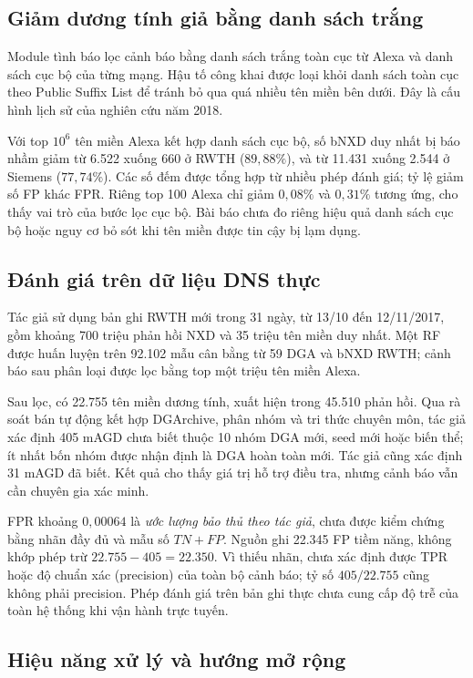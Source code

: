 \subsection{Giảm dương tính giả bằng danh sách trắng}\label{sec:giam-fp}

Module tình báo lọc cảnh báo bằng danh sách trắng toàn cục từ Alexa và danh sách cục bộ của từng mạng. Hậu tố công khai được loại khỏi danh sách toàn cục theo Public Suffix List để tránh bỏ qua quá nhiều tên miền bên dưới. Đây là cấu hình lịch sử của nghiên cứu năm 2018.

Với top $10^6$ tên miền Alexa kết hợp danh sách cục bộ, số bNXD duy nhất bị báo nhầm giảm từ 6.522 xuống 660 ở RWTH ($89{,}88\%$), và từ 11.431 xuống 2.544 ở Siemens ($77{,}74\%$). Các số đếm được tổng hợp từ nhiều phép đánh giá; tỷ lệ giảm số FP khác FPR. Riêng top 100 Alexa chỉ giảm $0{,}08\%$ và $0{,}31\%$ tương ứng, cho thấy vai trò của bước lọc cục bộ. Bài báo chưa đo riêng hiệu quả danh sách cục bộ hoặc nguy cơ bỏ sót khi tên miền được tin cậy bị lạm dụng.

\subsection{Đánh giá trên dữ liệu DNS thực}\label{sec:thuc-te}

Tác giả sử dụng bản ghi RWTH mới trong 31 ngày, từ 13/10 đến 12/11/2017, gồm khoảng 700 triệu phản hồi NXD và 35 triệu tên miền duy nhất. Một RF được huấn luyện trên 92.102 mẫu cân bằng từ 59 DGA và bNXD RWTH; cảnh báo sau phân loại được lọc bằng top một triệu tên miền Alexa.

Sau lọc, có 22.755 tên miền dương tính, xuất hiện trong 45.510 phản hồi. Qua rà soát bán tự động kết hợp DGArchive, phân nhóm và tri thức chuyên môn, tác giả xác định 405 mAGD chưa biết thuộc 10 nhóm DGA mới, seed mới hoặc biến thể; ít nhất bốn nhóm được nhận định là DGA hoàn toàn mới. Tác giả cũng xác định 31 mAGD đã biết. Kết quả cho thấy giá trị hỗ trợ điều tra, nhưng cảnh báo vẫn cần chuyên gia xác minh.

FPR khoảng $0{,}00064$ là \emph{ước lượng bảo thủ theo tác giả}, chưa được kiểm chứng bằng nhãn đầy đủ và mẫu số $TN+FP$. Nguồn ghi 22.345 FP tiềm năng, không khớp phép trừ $22.755-405=22.350$. Vì thiếu nhãn, chưa xác định được TPR hoặc độ chuẩn xác (precision) của toàn bộ cảnh báo; tỷ số $405/22.755$ cũng không phải precision. Phép đánh giá trên bản ghi thực chưa cung cấp độ trễ của toàn hệ thống khi vận hành trực tuyến.

\subsection{Hiệu năng xử lý và hướng mở rộng}\label{sec:toc-do}

